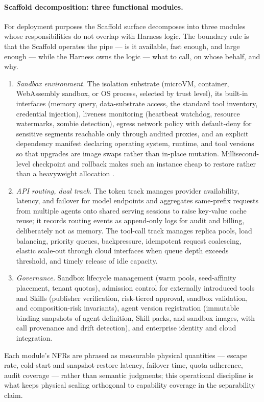 \paragraph{Scaffold decomposition: three functional modules.}
For deployment purposes the Scaffold surface decomposes into three modules whose responsibilities do not overlap with Harness logic. The boundary rule is that the Scaffold operates the pipe --- is it available, fast enough, and large enough --- while the Harness owns the logic --- what to call, on whose behalf, and why.
\begin{enumerate}
\item \textit{Sandbox environment.} The isolation substrate (microVM, container, WebAssembly sandbox, or OS process, selected by trust level), its built-in interfaces (memory query, data-substrate access, the standard tool inventory, credential injection), liveness monitoring (heartbeat watchdog, resource watermarks, zombie detection), egress network policy with default-deny for sensitive segments reachable only through audited proxies, and an explicit dependency manifest declaring operating system, runtime, and tool versions so that upgrades are image swaps rather than in-place mutation. Millisecond-level checkpoint and rollback makes such an instance cheap to restore rather than a heavyweight allocation \cite{dong2026deltabox}.
\item \textit{API routing, dual track.} The token track manages provider availability, latency, and failover for model endpoints and aggregates same-prefix requests from multiple agents onto shared serving sessions to raise key-value cache reuse; it records routing events as append-only logs for audit and billing, deliberately not as memory. The tool-call track manages replica pools, load balancing, priority queues, backpressure, idempotent request coalescing, elastic scale-out through cloud interfaces when queue depth exceeds threshold, and timely release of idle capacity.
\item \textit{Governance.} Sandbox lifecycle management (warm pools, seed-affinity placement, tenant quotas), admission control for externally introduced tools and Skills (publisher verification, risk-tiered approval, sandbox validation, and composition-risk invariants), agent version registration (immutable binding snapshots of agent definition, Skill packs, and sandbox images, with call provenance and drift detection), and enterprise identity and cloud integration.
\end{enumerate}
Each module's NFRs are phrased as measurable physical quantities --- escape rate, cold-start and snapshot-restore latency, failover time, quota adherence, audit coverage --- rather than semantic judgments; this operational discipline is what keeps physical scaling orthogonal to capability coverage in the separability claim.

